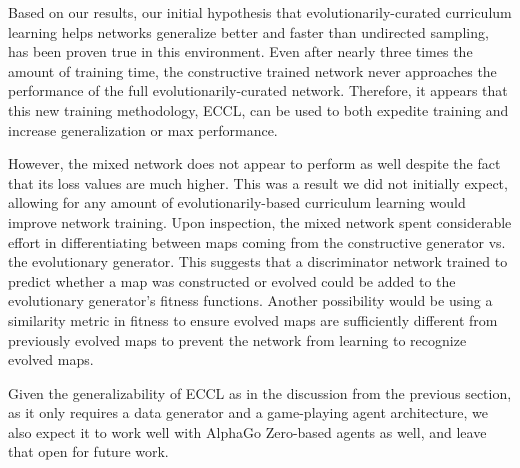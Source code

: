 \documentclass[letterpaper]{article} %
\begin{document}
Based on our results, our initial hypothesis that evolutionarily-curated curriculum learning helps networks generalize better and faster than undirected sampling, has been proven true in this environment. Even after nearly three times the amount of training time, the constructive trained network never approaches the performance of the full evolutionarily-curated network. Therefore, it appears that this new training methodology, ECCL, can be used to both expedite training and increase generalization or max performance. 

However, the mixed network does not appear to perform as well despite the fact that its loss values are much higher. This was a result we did not initially expect, allowing for any amount of evolutionarily-based curriculum learning would improve network training. Upon inspection, the mixed network spent considerable effort in differentiating between maps coming from the constructive generator vs. the evolutionary generator. This suggests that a discriminator network trained to predict whether a map was constructed or evolved could be added to the evolutionary generator's fitness functions. Another possibility would be using a similarity metric in fitness to ensure evolved maps are sufficiently different from previously evolved maps to prevent the network from learning to recognize evolved maps.

Given the generalizability of ECCL as in the discussion from the previous section, as it only requires a data generator and a game-playing agent architecture, we also expect it to work well with AlphaGo Zero-based agents as well, and leave that open for future work.



\end{document}
